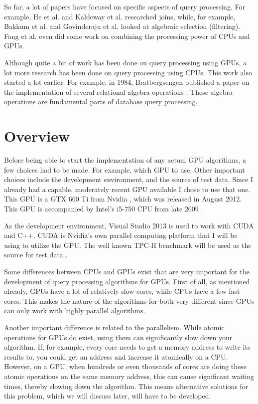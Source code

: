 \documentclass[a4paper,titlepage]{article}
\begin{document}
So far, a lot of papers have focused on specific aspects of query processing. For example, He et al. \cite{he2008} and Kaldeway et al. \cite{kaldeway2010} researched joins, while, for example, Bakkum et al. \cite{bakkum2010} and Govinderaju et al. \cite{govindaraju2004} looked at algebraic selection (filtering).  Fang et al. \cite{fang2007} even did some work on combining the processing power of CPUs and GPUs.

Although quite a bit of work has been done on query processing using GPUs, a lot more research has been done on query processing using CPUs. This work also started a lot earlier. For example, in 1984, Bratbergsengen published a paper on the implementation of several relational algebra operations \cite{bratbergsengen1984}. These algebra operations are fundamental parts of database query processing.

\section{Overview}
\label{sec:overview}
Before being able to start the implementation of any actual GPU algorithms, a few choices had to be made. For example, which GPU to use. Other important choices include the development environment, and the source of test data. Since I already had a capable, moderately recent GPU available I chose to use that one. This GPU is a GTX 660 Ti from Nvidia \cite{gtx660ti}, which was released in August 2012. This GPU is accompanied by Intel's i5-750 CPU from late 2009 \cite{i5-750}.

As the development environment, Visual Studio 2013 is used to work with CUDA \cite{CUDA} and C++. CUDA is Nvidia's own parallel computing platform that I will be using to utilize the GPU. The well known TPC-H benchmark will be used as the source for test data \cite{tpc-h}.

Some differences between CPUs and GPUs exist that are very important for the development of query processing algorithms for GPUs. First of all, as mentioned already, GPUs have a lot of relatively slow cores, while CPUs have a few fast cores. This makes the nature of the algorithms for both very different since GPUs can only work with highly parallel algorithms.

Another important difference is related to the parallelism. While atomic operations for GPUs do exist, using them can significantly slow down your algorithm. If, for example, every core needs to get a memory address to write its results to, you could get an address and increase it atomically on a CPU. However, on a GPU, when hundreds or even thousands of cores are doing these atomic operations on the same memory address, this can cause significant waiting times, thereby slowing down the algorithm. This means alternative solutions for this problem, which we will discuss later, will have to be developed.
\end{document}
